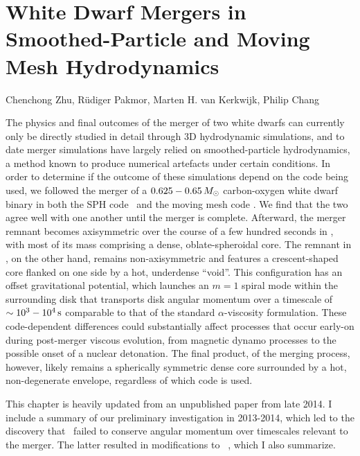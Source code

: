\chapter{White Dwarf Mergers in Smoothed-Particle and Moving Mesh Hydrodynamics}

\begin{center}
\begin{minipage}[c]{4.75in}
Chenchong Zhu, R\"{u}diger Pakmor, Marten H. van Kerkwijk, Philip Chang\\
\vspace{2em}
\end{minipage}
\end{center}

The physics and final outcomes of the merger of two white dwarfs can currently only be directly studied in detail through 3D hydrodynamic simulations, and to date merger simulations have largely relied on smoothed-particle hydrodynamics, a method known to produce numerical artefacts under certain conditions.  In order to determine if the outcome of these simulations depend on the code being used, we followed the merger of a $0.625 - 0.65\,\Msun$ carbon-oxygen white dwarf binary in both the SPH code \gasoline\ and the moving mesh code \arepo.  We find that the two agree well with one another until the merger is complete.  Afterward, the merger remnant becomes axisymmetric over the course of a few hundred seconds in \gasoline, with most of its mass comprising a dense, oblate-spheroidal core.  The remnant in \arepo, on the other hand, remains non-axisymmetric and features a crescent-shaped core flanked on one side by a hot, underdense ``void''.  This configuration has an offset gravitational potential, which launches an $m = 1$ spiral mode within the surrounding disk that transports disk angular momentum over a timescale of $\sim10^3-10^4\,\mathrm{s}$ comparable to that of the standard $\alpha$-viscosity formulation.  These code-dependent differences could substantially affect processes that occur early-on during post-merger viscous evolution, from magnetic dynamo processes to the possible onset of a nuclear detonation.  The final product, of the merging process, however, likely remains a spherically symmetric dense core surrounded by a hot, non-degenerate envelope, regardless of which code is used.

This chapter is heavily updated from an unpublished paper from late 2014.  I include a summary of our preliminary investigation in 2013-2014, which led to the discovery that \arepo\ failed to conserve angular momentum over timescales relevant to the merger.  The latter resulted in modifications to \arepo\ \citep{pakm+16}, which I also summarize.


